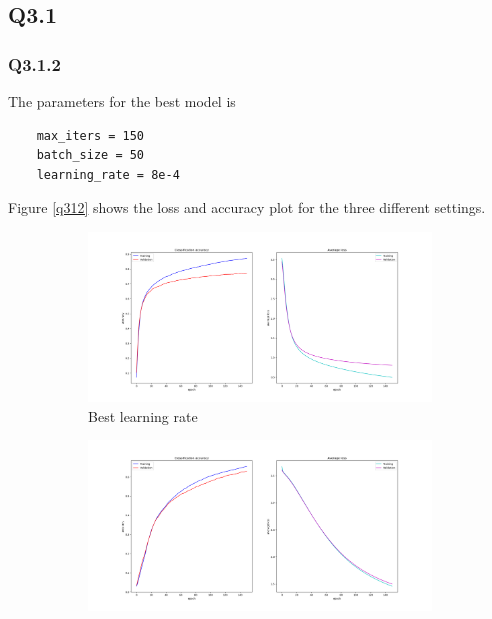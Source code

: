 \documentclass{article} %
\begin{document}
    \subsection*{Q3.1}

    \subsubsection*{Q3.1.2}
    The parameters for the best model is
    \begin{verbatim}
    max_iters = 150
    batch_size = 50
    learning_rate = 8e-4
    \end{verbatim}

    Figure \ref{q312} shows the loss and accuracy plot for the three different settings.
    \medskip

    \begin{figure}[H]
        \centering
        \begin{subfigure}[b]{0.8\textwidth}
            \includegraphics[width=\textwidth]{3,1,2 x0.1 graph.png}
            \caption{Best learning rate}
        \end{subfigure}
        \begin{subfigure}[b]{0.49\textwidth}
            \includegraphics[width=\textwidth]{3,1,2 x0.01 graph.png}

\end{subfigure}
\end{figure}
\end{document}
